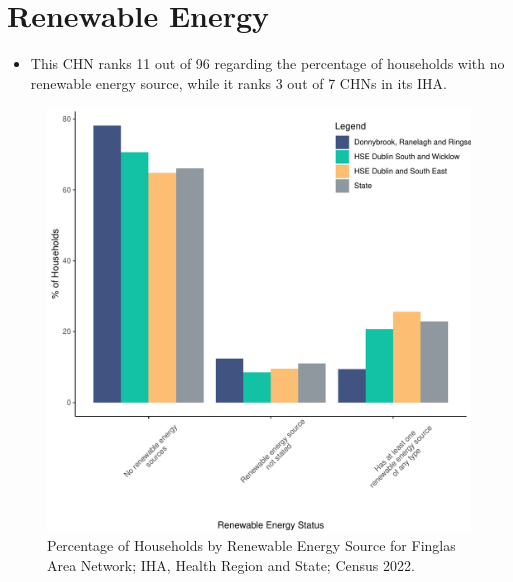 \documentclass{article}
\begin{document}
\section{Renewable Energy}\label{sect:RE}
\begin{itemize}
\item This CHN ranks  11 out of 96 regarding the percentage of households with no renewable energy source, while it ranks   3 out of 7 CHNs in its IHA.
\end{itemize}
\begin{figure}[H]
	\centering
	\includegraphics[width = 140mm]{../figures/RenewableEnergyED.pdf}
	\caption{Percentage of Households by Renewable Energy Source for Finglas Area Network; IHA, Health Region and State; Census 2022.}
	\label{fig:vbnv}
	\end{figure}
\end{document}
